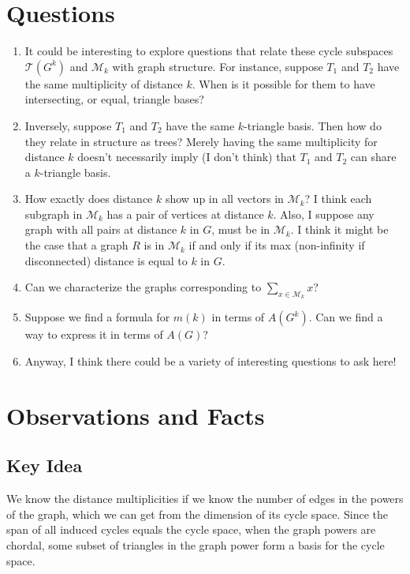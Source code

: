 \documentclass[12pt]{article}
\theoremstyle{definition}
\begin{document}
\section{Questions}

\begin{enumerate}
	\item It could be interesting to explore questions that relate these cycle subspaces $\mathcal{T}(G^k)$ and $\mathcal{M}_k$ with graph structure.  For instance, suppose $T_1$ and $T_2$ have the same multiplicity of distance $k$.  When is it possible for them to have intersecting, or equal, triangle bases?
	\item Inversely, suppose $T_1$ and $T_2$ have the same $k$-triangle basis.  Then how do they relate in structure as trees?  Merely having the same multiplicity for distance $k$ doesn't necessarily imply (I don't think) that $T_1$ and $T_2$ can share a $k$-triangle basis.
	\item How exactly does distance $k$ show up in all vectors in $\mathcal{M}_k$?  I think each subgraph in $\mathcal{M}_k$ has a pair of vertices at distance $k$.  Also, I suppose any graph with all pairs at distance $k$ in $G$, must be in $\mathcal{M}_k$.  I think it might be the case that a graph $R$ is in $\mathcal{M}_k$ if and only if its max (non-infinity if disconnected) distance is equal to $k$ in $G$.
	\item Can we characterize the graphs corresponding to $\sum_{x \in \mathcal{M}_k} x$?
	\item Suppose we find a formula for $m(k)$ in terms of $A(G^k)$.  Can we find a way to express it in terms of $A(G)$?
	\item Anyway, I think there could be a variety of interesting questions to ask here!
\end{enumerate}

\iffalse
\section{Observations and Facts}

\subsection{Key Idea}

We know the distance multiplicities if we know the number of edges in the powers of the graph, which we can get from the dimension of its cycle space.  Since the span of all induced cycles equals the cycle space, when the graph powers are chordal, some subset of triangles in the graph power form a basis for the cycle space.  
\end{document}
